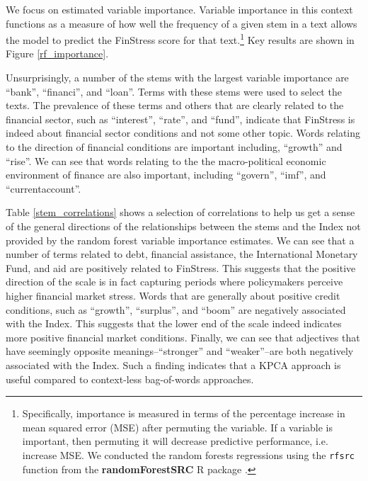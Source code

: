 \documentclass[]{article}
\begin{document}
We focus on estimated variable importance. Variable importance in this context functions as a measure of how well the frequency of a given stem in a text allows the model to predict the FinStress score for that text.\footnote{Specifically, importance is measured in terms of the percentage increase in mean squared error (MSE) after permuting the variable. If a variable is important, then permuting it will decrease predictive performance, i.e. increase MSE. We conducted the random forests regressions using the \texttt{rfsrc} function from the \textbf{randomForestSRC} R package \citep{randomForestSRCCite}.} Key results are shown in Figure \ref{rf_importance}.

Unsurprisingly, a number of the stems with the largest variable importance are ``bank'', ``financi'', and ``loan''. Terms with these stems were used to select the texts. The prevalence of these terms and others that are clearly related to the financial sector, such as ``interest'', ``rate'', and ``fund'', indicate that FinStress is indeed about financial sector conditions and not some other topic. Words relating to the direction of financial conditions are important including, ``growth'' and ``rise''. We can see that words relating to the the macro-political economic environment of finance are also important, including ``govern'', ``imf'', and ``currentaccount''.

Table \ref{stem_correlations} shows a selection of correlations to help us get a sense of the general directions of the relationships between the stems and the Index not provided by the random forest variable importance estimates. We can see that a number of terms related to debt, financial assistance, the International Monetary Fund, and aid are positively related to FinStress. This suggests that the positive direction of the scale is in fact capturing periods where policymakers perceive higher financial market stress. Words that are generally about positive credit conditions, such as ``growth'', ``surplus'', and ``boom'' are negatively associated with the Index. This suggests that the lower end of the scale indeed indicates more positive financial market conditions. Finally, we can see that adjectives that have seemingly opposite meanings--``stronger'' and ``weaker''--are both negatively associated with the Index. Such a finding indicates that a KPCA approach is useful compared to context-less bag-of-words approaches.
\end{document}
